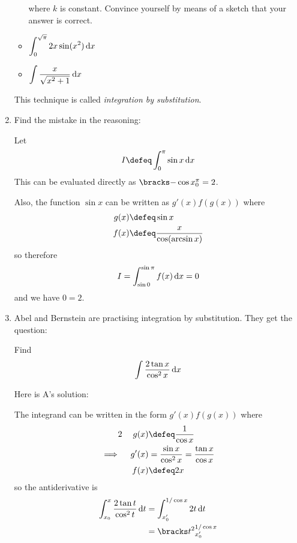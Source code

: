 \begin{enumerate}
\begin{itemize}
    where \(k\) is constant. Convince yourself by means of a sketch that your
    answer is correct.
   \item \(\displaystyle
    \integ[0]<\sqrt \pi>{2x \sin(x^2)}{x}
    \)
   \item \(\displaystyle
    \integ{\frac x{\sqrt{x^2 + 1}}}{x}
    \)
  \end{itemize}
  This technique is called \emph{integration by substitution}.
 \item
  Find the mistake in the reasoning:
  \begin{tcolorbox}
   Let
   \begin{equation*}
    I \defeq \integ[0]<\pi>{\sin x}{x}
   \end{equation*}
   This can be evaluated directly as \(\eval{0}{\pi}{-\cos x} = 2\).

   Also, the function \(\sin x\) can be written as \(g'(x) f(g(x))\) where
   \begin{align*}
    g(x) &\defeq \sin x \\
    f(x) &\defeq \frac x{\cos(\arcsin x)}
   \end{align*}
   so therefore
   \begin{equation*}
    I = \integ[\sin 0]<\sin \pi>{f(x)}{x} = 0
   \end{equation*}
   and we have \(0 = 2\).
  \end{tcolorbox}
 \item
  Abel and Bernstein are practising integration by substitution. They get the
  question:
  \begin{tcolorbox}
   Find
   \begin{equation*}
    \integ{\frac{2\tan x}{\cos^2 x}}{x}
   \end{equation*}
  \end{tcolorbox}
  Here is A's solution:
  \begin{tcolorbox}
   The integrand can be written in the form \(g'(x) f(g(x))\) where
   \begin{alignat*}2
    &&g(x) &\defeq \frac 1{\cos x} \\
    \implies{}&& g'(x) &=
     \frac{\sin x}{\cos^2 x} =
     \frac{\tan x}{\cos x} \\
    &&f(x) &\defeq 2x
   \end{alignat*}
   so the antiderivative is
   \begin{align*}
    \integ[x_0]<x>{\frac{2\tan t}{\cos^2 t}}{t}
     &= \integ[x_0']<1/\cos x>{2t}{t} \\
     &= \eval{x_0'}{1/\cos x}{t^2} \\

\end{align*}
\end{tcolorbox}
\end{enumerate}
